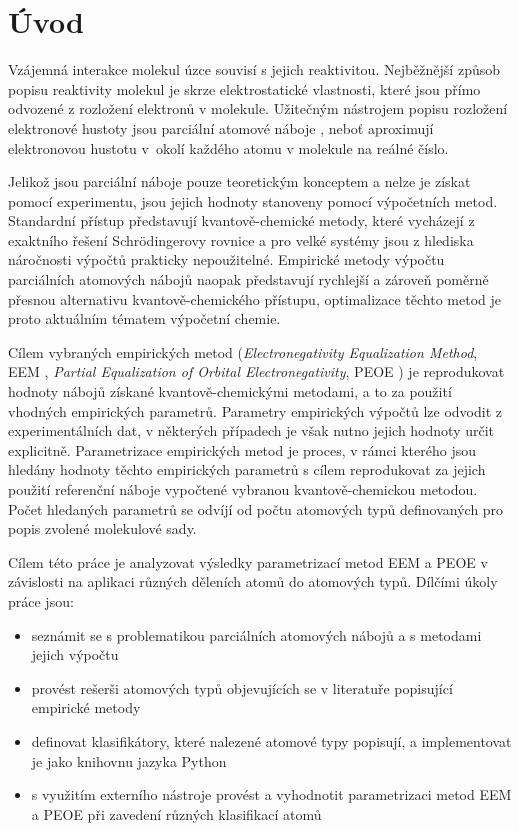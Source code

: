 \chapter{Úvod}
\setcounter{page}{1}
Vzájemná interakce molekul úzce souvisí s jejich reaktivitou.
Nejběžnější způsob popisu reaktivity molekul je skrze  elektrostatické vlastnosti, které jsou pří\-mo odvozené z rozložení elektronů v molekule. Užitečným nástrojem popisu rozložení elektronové hustoty jsou parciální atomové náboje \cite{Atkins}, neboť aproximují elektronovou hustotu v~o\-kolí každého atomu v molekule na reálné číslo.

Jelikož jsou parciální náboje pouze teoretickým konceptem a nelze je získat pomocí experimentu, jsou jejich hodnoty stanoveny pomocí výpočetních metod. Standardní přístup představují kvantově-chemické metody, které vycházejí z exaktního řešení Schrödingerovy rovnice \cite{Volatron} a pro velké systémy jsou z hlediska náročnosti výpočtů prakticky nepoužitelné. Empirické metody výpočtu parciálních atomových nábojů naopak představují rychlejší a zároveň poměrně přesnou alternativu kvantově-chemické\-ho přístupu, optimalizace těchto metod je proto aktuálním tématem výpočetní chemie. 

Cílem vybraných empirických metod (\textit{Electronegativity Equalization Method}, EEM \cite{eem}, \textit{Partial Equalization of Orbital Electronegativity}, PEOE \cite{GM}) je reprodukovat hodnoty nábojů získané kvantově-chemickými metodami, a to za použití vhodných empirických parametrů. Parametry empirických výpočtů lze odvodit z experimentálních dat, v některých případech je však nutno jejich hodnoty určit explicitně. Parametrizace empirických metod je proces, v rámci kterého jsou hledány hodnoty těchto empirických parametrů s cílem reprodukovat za jejich použití referenční náboje vypočtené vybranou kvantově-chemickou metodou. Počet hledaných parametrů se odvíjí od počtu atomových typů definovaných pro popis zvolené molekulové sady. 

Cílem této práce je analyzovat výsledky parametrizací metod EEM a PEOE v závislosti na aplikaci různých děleních atomů do atomových typů.
Dílčími úkoly práce jsou:
\begin{itemize}
    \item seznámit se s problematikou parciálních atomových nábojů a s metodami jejich výpočtu
    \item provést rešerši atomových typů objevujících se v literatuře popisující empirické metody
    \item definovat klasifikátory, které nalezené atomové typy popisují, a implementovat je jako knihovnu jazyka Python
    \item s využitím externího nástroje provést a vyhodnotit parametrizaci metod EEM a PEOE při zavedení různých klasifikací atomů
\end{itemize}


